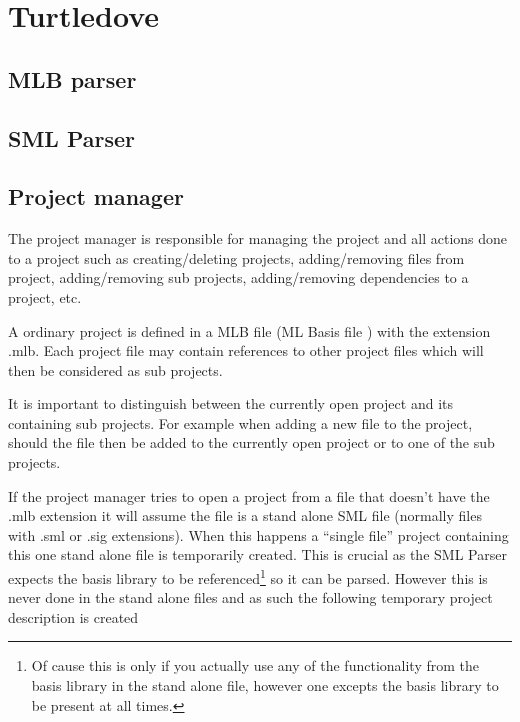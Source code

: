 
\section{Turtledove}
\label{sec:design-turtledove}


\subsection{MLB parser}
\label{sec:design-mlb-parser}

\subsection{SML Parser}
\label{sec:design-sml-parser}


\subsection{Project manager}
\label{sec:design-project-manager}


The project manager is responsible for managing the project and all actions done
to a project such as creating/deleting projects, adding/removing files from
project, adding/removing sub projects, adding/removing dependencies to a
project, etc.

A ordinary project is defined in a MLB file (ML Basis file \cite{mlbasis}) with
the extension .mlb. Each project file may contain references to other project
files which will then be considered as sub projects.

It is important to distinguish between the currently open project and its
containing sub projects. For example when adding a new file to the project,
should the file then be added to the currently open project or to one of the sub
projects.


If the project manager tries to open a project from a file that doesn't have the
.mlb extension it will assume the file is a stand alone SML file (normally files
with .sml or .sig extensions). When this happens a ``single file'' project
containing this one stand alone file is temporarily created. This is crucial as
the SML Parser expects the basis library to be referenced\footnote{Of cause this
  is only if you actually use any of the functionality from the basis library in
  the stand alone file, however one excepts the basis library to be present at
  all times.} so it can be parsed. However this is never done in the stand alone
files and as such the following temporary project description is created

